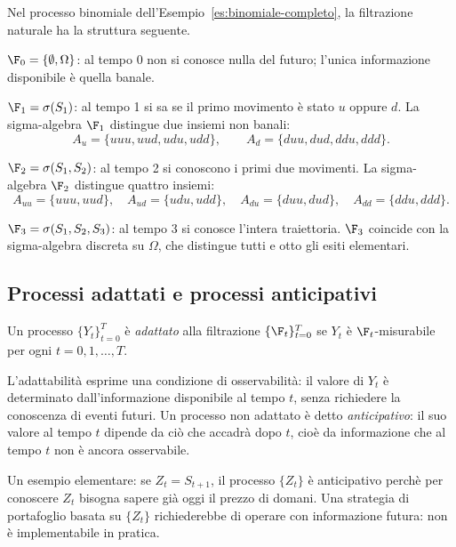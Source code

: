 \begin{example}
\label{es:filtrazione}
Nel processo binomiale dell'Esempio~\ref{es:binomiale-completo},
la filtrazione naturale ha la struttura seguente.

\smallskip
\noindent
$\F_0=\{\emptyset,\Omega\}$: al tempo 0 non si conosce nulla del
futuro; l'unica informazione disponibile \`{e} quella banale.

\smallskip
\noindent
$\F_1=\sigma(S_1)$: al tempo 1 si sa se il primo movimento \`{e}
stato $u$ oppure $d$. La sigma-algebra $\F_1$ distingue due insiemi
non banali:
\[
A_u=\{uuu,uud,udu,udd\}, \qquad A_d=\{duu,dud,ddu,ddd\}.
\]

\smallskip
\noindent
$\F_2=\sigma(S_1,S_2)$: al tempo 2 si conoscono i primi due movimenti.
La sigma-algebra $\F_2$ distingue quattro insiemi:
\[
A_{uu}=\{uuu,uud\},\quad A_{ud}=\{udu,udd\},\quad
A_{du}=\{duu,dud\},\quad A_{dd}=\{ddu,ddd\}.
\]

\smallskip
\noindent
$\F_3=\sigma(S_1,S_2,S_3)$: al tempo 3 si conosce l'intera
traiettoria. $\F_3$ coincide con la sigma-algebra discreta su $\Omega$,
che distingue tutti e otto gli esiti elementari.

\smallskip
\end{example}

\subsection{Processi adattati e processi anticipativi}

\begin{definition}
\label{def:adattato}
Un processo $\{Y_t\}_{t=0}^{T}$ \`{e} \emph{adattato} alla
filtrazione $\{\F_t\}_{t=0}^{T}$ se $Y_t$ \`{e} $\F_t$-misurabile
per ogni $t=0,1,\ldots,T$.
\end{definition}

L'adattabilit\`{a} esprime una condizione di osservabilit\`{a}: il
valore di $Y_t$ \`{e} determinato dall'informazione disponibile al
tempo $t$, senza richiedere la conoscenza di eventi futuri. Un processo
non adattato \`{e} detto \emph{anticipativo}: il suo valore
al tempo $t$ dipende da ci\`{o} che accadr\`{a} dopo $t$, cio\`{e} da
informazione che al tempo $t$ non \`{e} ancora osservabile.

Un esempio elementare: se $Z_t = S_{t+1}$, il processo $\{Z_t\}$ \`{e}
anticipativo perch\`{e} per conoscere $Z_t$ bisogna sapere gi\`{a} oggi
il prezzo di domani. Una strategia di portafoglio basata su $\{Z_t\}$
richiederebbe di operare con informazione futura: non \`{e}
implementabile in pratica.

